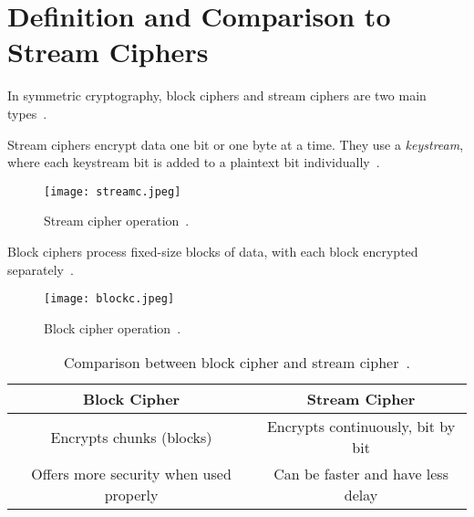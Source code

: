 \section{Definition and Comparison to Stream Ciphers}

In symmetric cryptography, block ciphers and stream ciphers are two main types~\cite{Paar2024}.

Stream ciphers encrypt data one bit or one byte at a time. They use a \textit{keystream}, where each keystream bit is added to a plaintext bit individually~\cite{Paar2024}.

\begin{figure}[H]
    \centering
    \texttt{[image: streamc.jpeg]}
    \caption{Stream cipher operation~\cite{Paar2024}.}
    \label{fig:stream_cipher}
\end{figure}

Block ciphers process fixed-size blocks of data, with each block encrypted separately~\cite{Paar2024}.

\begin{figure}[H]
    \centering
    \texttt{[image: blockc.jpeg]}
    \caption{Block cipher operation~\cite{Paar2024}.}
    \label{fig:block_cipher}
\end{figure}

\begin{table}[H]
\centering
\begin{tabular}{|c|c|}
\hline
\textbf{Block Cipher} & \textbf{Stream Cipher} \\
\hline
Encrypts chunks (blocks) & Encrypts continuously, bit by bit \\
\hline
Offers more security when used properly & Can be faster and have less delay \\
\hline
\end{tabular}
\caption{Comparison between block cipher and stream cipher~\cite{Paar2024}.}
\label{tab:block_vs_stream}
\end{table}